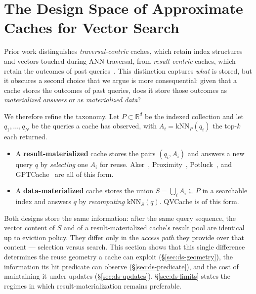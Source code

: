 %
%

\section{The Design Space of Approximate Caches for Vector Search}
\label{sec:design-space}

Prior work distinguishes \emph{traversal-centric} caches, which retain
index structures and vectors touched during ANN traversal, from
\emph{result-centric} caches, which retain the outcomes of past
queries~\cite{aker}. This distinction captures \emph{what} is stored,
but it obscures a second choice that we argue is more consequential:
given that a cache stores the outcomes of past queries, does it store
those outcomes as \emph{materialized answers} or as \emph{materialized
data}?

We therefore refine the taxonomy. Let $P \subset \mathbb{R}^d$ be the
indexed collection and let $q_1,\dots,q_N$ be the queries a cache has
observed, with $A_i = \mathrm{kNN}_P(q_i)$ the top-$k$ each returned.

\begin{itemize}
  \item A \textbf{result-materialized} cache stores the pairs
        $(q_i, A_i)$ and answers a new query $q$ by \emph{selecting}
        one $A_i$ for reuse. Aker~\cite{aker}, Proximity~\cite{proximity},
        Potluck~\cite{potluck}, and GPTCache~\cite{gptcache} are all of
        this form.
  \item A \textbf{data-materialized} cache stores the union
        $S = \bigcup_i A_i \subseteq P$ in a searchable index and answers
        $q$ by \emph{recomputing} $\mathrm{kNN}_S(q)$. QVCache is of this
        form.
\end{itemize}

Both designs store the same information: after the same query sequence,
the vector content of $S$ and of a result-materialized cache's result
pool are identical up to eviction policy. They differ only in the
\emph{access path} they provide over that content --- selection versus
search. This section shows that this single difference determines the
reuse geometry a cache can exploit (\S\ref{sec:ds-geometry}), the
information its hit predicate can observe (\S\ref{sec:ds-predicate}),
and the cost of maintaining it under updates
(\S\ref{sec:ds-updates}). \S\ref{sec:ds-limits} states the regimes in
which result-materialization remains preferable.

